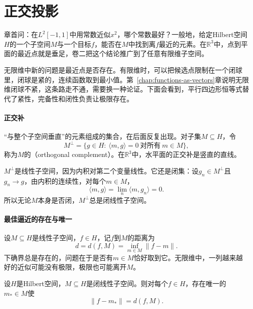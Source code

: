 \section{正交投影}
\label{sec:ipspace-orthogonal-projection}

章首问：在$L^2[-1,1]$中用常数近似$x^2$，哪个常数最好？一般地，给定Hilbert空间$H$的一个子空间$M$与一个目标$f$，能否在$M$中找到离$f$最近的元素。在$\mathbb R^3$中，点到平面的最近点就是垂足，卷二把这个结论推广到了任意有限维子空间。

无限维中新的问题是最近点是否存在。有限维时，可以把候选点限制在一个闭球里，闭球是紧的，连续函数取到最小值。第~\ref{chap:functions-as-vectors}章说明无限维闭球不紧，这条路走不通，需要换一种论证。下面会看到，平行四边形恒等式替代了紧性，完备性和闭性负责让极限存在。

\paragraph{正交补}
“与整个子空间垂直”的元素组成的集合，在后面反复出现。对子集$M\subseteq H$，令
\begin{equation}
 M^\perp=\{g\in H:\ \langle m,g\rangle=0\ \text{对所有}\ m\in M\},
 \label{eq:ipspace-orthogonal-complement}
\end{equation}
称为$M$的（orthogonal complement）。在$\mathbb R^3$中，水平面的正交补是竖直的直线。

$M^\perp$是线性子空间，因为内积对第二个变量线性。它还是闭集：设$g_n\in M^\perp$且$g_n\to g$，由内积的连续性，对每个$m\in M$，
\[
 \langle m,g\rangle=\lim_n\langle m,g_n\rangle=0 .
\]
所以无论$M$本身是否闭，$M^\perp$总是闭线性子空间。

\paragraph{最佳逼近的存在与唯一}
设$M\subseteq H$是线性子空间，$f\in H$，记$f$到$M$的距离为
\begin{equation}
 d=d(f,M)=\inf_{m\in M}\lVert f-m\rVert .
 \label{eq:ipspace-distance}
\end{equation}
下确界总是存在的，问题在于是否有$m\in M$恰好取到它。无限维中，一列越来越好的近似可能没有极限，极限也可能离开$M$。

\begin{theorem}[闭子空间上的最佳逼近]
\label{thm:ipspace-best-approximation}
设$H$是Hilbert空间，$M\subseteq H$是闭线性子空间。则对每个$f\in H$，存在唯一的$m_*\in M$使
\begin{equation}
 \lVert f-m_*\rVert=d(f,M).
 \label{eq:ipspace-best-approximation}
\end{equation}
\end{theorem}

